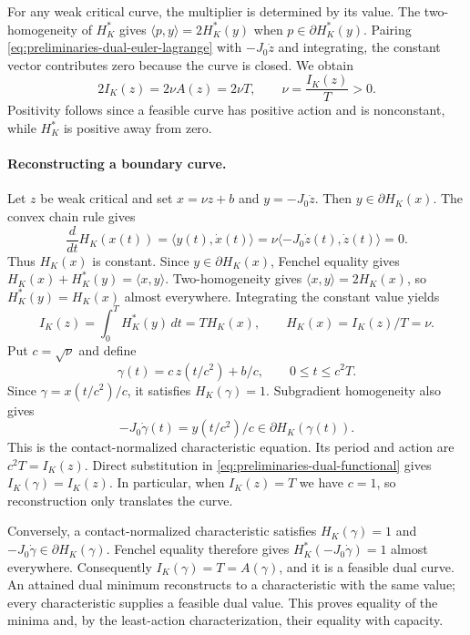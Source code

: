 For any weak critical curve, the multiplier is determined by its value.
The two-homogeneity of $H_K^*$ gives
$\langle p,y\rangle=2H_K^*(y)$ when $p\in\partial H_K^*(y)$.
Pairing \eqref{eq:preliminaries-dual-euler-lagrange} with $-J_0\dot z$
and integrating, the constant vector contributes zero because the curve
is closed. We obtain
\begin{equation}\label{eq:preliminaries-dual-multiplier-value}
 2I_K(z)=2\nu A(z)=2\nu T,
 \qquad \nu=\frac{I_K(z)}{T}>0.
\end{equation}
Positivity follows since a feasible curve has positive action and is
nonconstant, while $H_K^*$ is positive away from zero.

\paragraph{Reconstructing a boundary curve.}
Let $z$ be weak critical and set $x=\nu z+b$ and $y=-J_0\dot z$.
Then $y\in\partial H_K(x)$. The convex chain rule gives
\[
 \frac{d}{dt}H_K(x(t))=\langle y(t),\dot x(t)\rangle
 =\nu\langle-J_0\dot z(t),\dot z(t)\rangle=0.
\]
Thus $H_K(x)$ is constant. Since $y\in\partial H_K(x)$, Fenchel equality gives
$H_K(x)+H_K^*(y)=\langle x,y\rangle$. Two-homogeneity gives
$\langle x,y\rangle=2H_K(x)$, so $H_K^*(y)=H_K(x)$ almost everywhere.
Integrating the constant value yields
\[
 I_K(z)=\int_0^T H_K^*(y)\,dt=T H_K(x),
 \qquad H_K(x)=I_K(z)/T=\nu.
\]
Put $c=\sqrt\nu$ and define
\[
 \gamma(t)=c\,z(t/c^2)+b/c,\qquad 0\leq t\leq c^2T.
\]
Since $\gamma=x(t/c^2)/c$, it satisfies $H_K(\gamma)=1$.
Subgradient homogeneity also gives
\[
 -J_0\dot\gamma(t)=y(t/c^2)/c\in\partial H_K(\gamma(t)).
\]
This is the contact-normalized characteristic equation. Its period and
action are $c^2T=I_K(z)$. Direct substitution in
\eqref{eq:preliminaries-dual-functional} gives $I_K(\gamma)=I_K(z)$.
In particular, when $I_K(z)=T$ we have $c=1$, so reconstruction only
translates the curve.

Conversely, a contact-normalized characteristic satisfies
$H_K(\gamma)=1$ and $-J_0\dot\gamma\in\partial H_K(\gamma)$.
Fenchel equality therefore gives $H_K^*(-J_0\dot\gamma)=1$ almost
everywhere. Consequently $I_K(\gamma)=T=A(\gamma)$, and it is a feasible
dual curve. An attained dual minimum reconstructs to a characteristic
with the same value; every characteristic supplies a feasible dual value.
This proves equality of the minima and, by the least-action
characterization, their equality with capacity.

